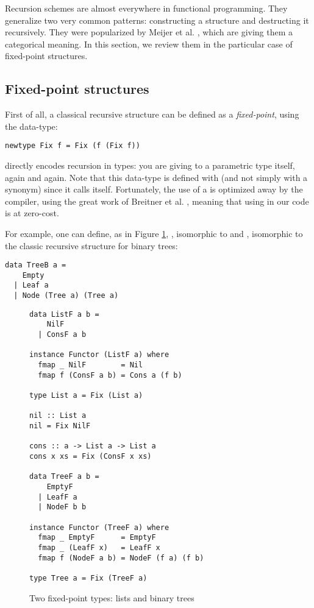 
Recursion schemes are almost everywhere in functional programming. They generalize two very common patterns: constructing a structure and destructing it recursively. They were popularized by Meijer et al. \cite{4cec4a43c86444479dc0003182424795}, which are giving them a categorical meaning. In this section, we review them in the particular case of fixed-point structures.

\subsection{Fixed-point structures}
\label{subsec:defi}
First of all, a classical recursive structure can be defined as a \emph{fixed-point}, using the  data-type:
\begin{verbatim}
newtype Fix f = Fix (f (Fix f))
\end{verbatim}
 directly encodes recursion in types: you are giving to a parametric type itself, again and again. Note that this data-type is defined with  (and not simply with a  synonym) since it calls itself. Fortunately, the use of a  is optimized away by the compiler, using the great work of Breitner et al. \cite{Breitner:2014:SZC:2692915.2628141}, meaning that using  in our code is at zero-cost.

For example, one can define, as in Figure \ref{fig:listtree},
, isomorphic to \hs{[a]} and , isomorphic to the classic recursive structure for binary trees:
\begin{verbatim}
data TreeB a =
    Empty
  | Leaf a
  | Node (Tree a) (Tree a)
\end{verbatim}

\begin{figure}
\begin{verbatim}
data ListF a b =
    NilF
  | ConsF a b

instance Functor (ListF a) where
  fmap _ NilF        = Nil
  fmap f (ConsF a b) = Cons a (f b)

type List a = Fix (List a)

nil :: List a
nil = Fix NilF

cons :: a -> List a -> List a
cons x xs = Fix (ConsF x xs)

data TreeF a b =
    EmptyF
  | LeafF a
  | NodeF b b

instance Functor (TreeF a) where
  fmap _ EmptyF      = EmptyF
  fmap _ (LeafF x)   = LeafF x
  fmap f (NodeF a b) = NodeF (f a) (f b)

type Tree a = Fix (TreeF a)
\end{verbatim}
\caption{Two fixed-point types: lists and binary trees}
\label{fig:listtree}
\end{figure}

